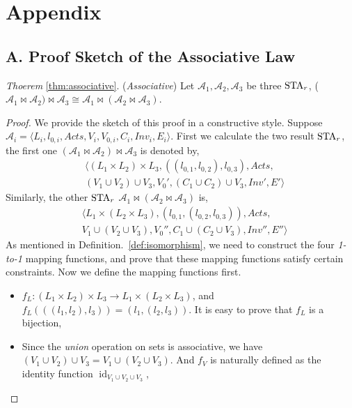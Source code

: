 \clearpage
\section*{Appendix}
\subsection*{A. Proof Sketch of the Associative Law}

\noindent\emph{Thoerem} \ref{thm:associative}. (\emph{Associative})
Let $\mathscr{A}_1, \mathscr{A}_2, \mathscr{A}_3$ be three $\mbox{STA}_r$, ($\mathscr{A}_{1}\bowtie \mathscr{A}_{2})\bowtie \mathscr{A}_{3}\cong\mathscr{A}_{1}\bowtie(\mathscr{A}_{2}\bowtie \mathscr{A}_{3})$.

\begin{proof}
We provide the sketch of this proof in a constructive style. Suppose $\mathscr{A}_i=\langle L_{i}, l_{0,i}, Acts, V_{i}, V_{0,i}, C_{i}, Inv_{i}, E_{i}\rangle$. First we calculate the two result $\mbox{STA}_r$, the first one $(\mathscr{A}_{1}\bowtie \mathscr{A}_{2})\bowtie \mathscr{A}_{3}$ is denoted by,
\begin{eqnarray*}
    & \langle
        (L_1\times L_2)\times L_3, ((l_{0,1}, l_{0,2}), l_{0,3}),
        Acts, \\
        & (V_1\cup V_2)\cup V_3,
        V_0',
        (C_1\cup C_2)\cup V_3,
        Inv', E'
    \rangle
\end{eqnarray*}
Similarly, the other $\mbox{STA}_r$ $\mathscr{A}_{1}\bowtie(\mathscr{A}_{2}\bowtie \mathscr{A}_{3})$ is,
\begin{eqnarray*}
    & \langle
        L_1\times (L_2\times L_3), (l_{0,1}, (l_{0,2}, l_{0,3})),
        Acts, \\
        & V_1\cup(V_2\cup V_3),
        V_0'',
        C_1\cup (C_2\cup V_3),
        Inv'', E''
    \rangle
\end{eqnarray*}
As mentioned in Definition.~\ref{def:isomorphism}, we need to construct the four \emph{1-to-1} mapping functions, and prove that these mapping functions satisfy certain constraints. Now we define the mapping functions first.

\begin{itemize}
    \item $f_L:(L_1\times L_2)\times L_3\rightarrow L_1\times (L_2\times L_3)$, and $f_L(((l_1,l_2), l_3))=(l_1,(l_2,l_3))$. It is easy to prove that $f_L$ is a bijection,
    \item Since the \emph{union} operation on sets is associative, we have $(V_1\cup V_2)\cup V_3=V_1\cup(V_2\cup V_3)$. And $f_V$ is naturally defined as the identity function $\operatorname{id}_{V_1\cup V_2\cup V_3}$,
\end{itemize}


\end{proof}
